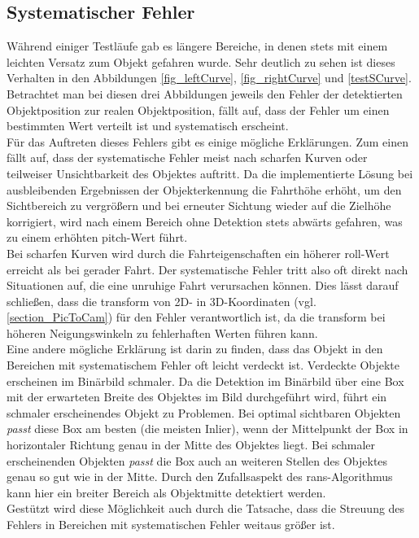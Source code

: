 \subsection{Systematischer Fehler}
\label{sec_sysError}
Während einiger Testläufe gab es längere Bereiche, in denen stets mit einem leichten Versatz zum Objekt gefahren wurde. Sehr deutlich zu sehen ist dieses Verhalten in den Abbildungen \ref{fig_leftCurve}, \ref{fig_rightCurve} und \ref{testSCurve}. Betrachtet man bei diesen drei Abbildungen jeweils den Fehler der detektierten Objektposition zur realen Objektposition, fällt auf, dass der Fehler um einen bestimmten Wert verteilt ist und systematisch erscheint.\\
Für das Auftreten dieses Fehlers gibt es einige mögliche Erklärungen.
Zum einen fällt auf, dass der systematische Fehler meist nach scharfen Kurven oder teilweiser Unsichtbarkeit des Objektes auftritt. Da die implementierte Lösung bei ausbleibenden Ergebnissen der Objekterkennung die Fahrthöhe erhöht, um den Sichtbereich zu vergrößern und bei erneuter Sichtung wieder auf die Zielhöhe korrigiert, wird nach einem Bereich ohne Detektion stets abwärts gefahren, was zu einem erhöhten \gls{pitch}-Wert führt.\\
Bei scharfen Kurven wird durch die Fahrteigenschaften ein höherer \gls{roll}-Wert erreicht als bei gerader Fahrt.
Der systematische Fehler tritt also oft direkt nach Situationen auf, die eine unruhige Fahrt verursachen können. Dies lässt darauf schließen, dass die \gls{transform} von 2D- in 3D-Koordinaten (vgl. \ref{section_PicToCam}) für den Fehler verantwortlich ist, da die \gls{transform} bei höheren Neigungswinkeln zu fehlerhaften Werten führen kann.\\
Eine andere mögliche Erklärung ist darin zu finden, dass das Objekt in den Bereichen mit systematischem Fehler oft leicht verdeckt ist. Verdeckte Objekte erscheinen im Binärbild schmaler. Da die Detektion im Binärbild über eine Box mit der erwarteten Breite des Objektes im Bild durchgeführt wird, führt ein schmaler erscheinendes Objekt zu Problemen. Bei optimal sichtbaren Objekten \textit{passt} diese Box am besten (die meisten Inlier), wenn der Mittelpunkt der Box in horizontaler Richtung genau in der Mitte des Objektes liegt. Bei schmaler erscheinenden Objekten \textit{passt} die Box auch an weiteren Stellen des Objektes genau so gut wie in der Mitte. Durch den Zufallsaspekt des \gls{rans}-Algorithmus kann hier ein breiter Bereich als Objektmitte detektiert werden.\\
Gestützt wird diese Möglichkeit auch durch die Tatsache, dass die Streuung des Fehlers in Bereichen mit systematischen Fehler weitaus größer ist.